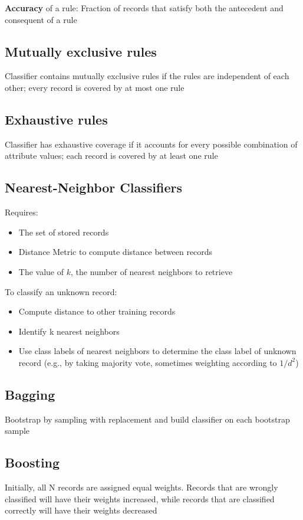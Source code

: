 \documentclass[12pt]{amsart}
\begin{document}
\textbf{Accuracy} of a rule:
Fraction of records
that satisfy both the
antecedent and
consequent of a
rule


\subsection{Mutually exclusive rules}
Classifier contains mutually exclusive rules if
the rules are independent of each other; every record is covered by at most one rule


\subsection{Exhaustive rules}
Classifier has exhaustive coverage if it
accounts for every possible combination of
attribute values; each record is covered by at least one rule

\subsection{Nearest-Neighbor Classifiers}
Requires:
\begin{itemize}
  \item The set of stored records
\item Distance Metric to compute
distance between records
\item The value of $k$, the number of
nearest neighbors to retrieve 
\end{itemize}
To classify an unknown record:
\begin{itemize}
\item Compute distance to other
training records
\item Identify k nearest neighbors
\item Use class labels of nearest
neighbors to determine the
class label of unknown record
(e.g., by taking majority vote, sometimes weighting according to $1/d^2$)
\end{itemize}



\subsection{Bagging}
Bootstrap by sampling with replacement and build classifier on each bootstrap sample


\subsection{Boosting}
Initially, all N records are assigned equal
weights. Records that are wrongly classified will have their
weights increased, while records that are classified correctly will have
their weights decreased
\end{document}
